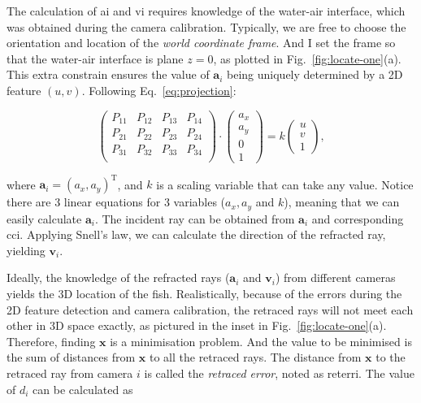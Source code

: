 \documentclass[11pt,twoside]{report}
\begin{document}
The calculation of \gls{ai} and \gls{vi} requires knowledge of the water-air interface, which was obtained during the camera calibration. Typically, we are free to choose the orientation and location of the \emph{world coordinate frame}. And I set the frame so that the water-air interface is plane $z = 0$, as plotted in Fig.~\ref{fig:locate-one}(a). This extra constrain ensures the value of $\mathbf{a}_i$ being uniquely determined by a 2D feature $(u, v)$. Following Eq.~\ref{eq:projection}:

$$
\left(
\begin{matrix}
	P_{11} & P_{12} & P_{13} & P_{14} \\
	P_{21} & P_{22} & P_{23} & P_{24} \\
	P_{31} & P_{32} & P_{33} & P_{34} \\
\end{matrix}
\right) 
\cdot
\left(
\begin{matrix}
a_x \\ a_y \\ 0 \\ 1	
\end{matrix}
\right) =
k\left(
\begin{matrix}
	u \\ v \\ 1
\end{matrix}
\right),
$$

\noindent where $\mathbf{a}_i = (a_x, a_y)^\mathrm{T}$, and $k$ is a scaling variable that can take any value. Notice there are 3 linear equations for 3 variables ($a_x, a_y$ and $k$), meaning that we can easily calculate $\mathbf{a}_i$. The incident ray can be obtained from $\mathbf{a}_i$ and corresponding \gls{cci}. Applying Snell's law, we can calculate the direction of the refracted ray, yielding $\mathbf{v}_i$. %


Ideally, the knowledge of the refracted rays ($\mathbf{a}_i$ and $\mathbf{v}_i$) from different cameras yields the 3D location of the fish. Realistically, because of the errors during the 2D feature detection and camera calibration, the retraced rays will not meet each other in 3D space exactly, as pictured in the inset in Fig.~\ref{fig:locate-one}(a). Therefore, finding $\mathbf{x}$ is a minimisation problem. And the value to be minimised is the sum of distances from $\mathbf{x}$ to all the retraced rays. The distance from $\mathbf{x}$ to the retraced ray from camera $i$ is called the \emph{retraced error}, noted as \gls{reterri}. The value of $d_i$ can be calculated as
\end{document}
